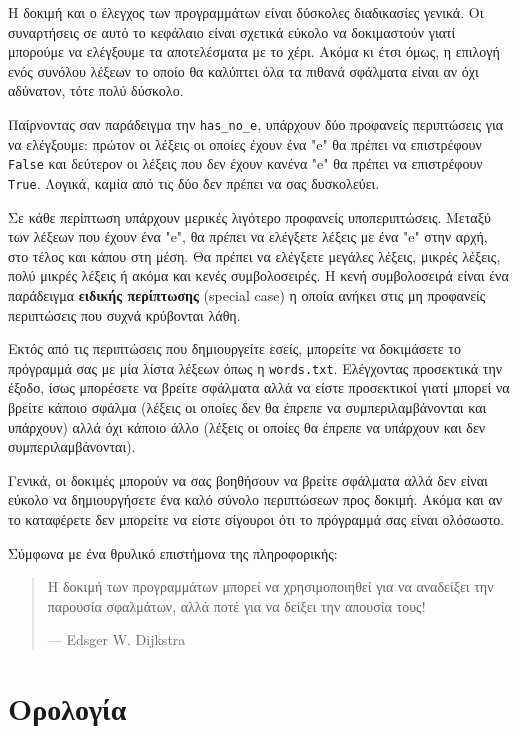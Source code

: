 \documentclass[10pt]{book}
\begin{document}
Η δοκιμή και ο έλεγχος των προγραμμάτων είναι δύσκολες διαδικασίες γενικά.
Οι συναρτήσεις σε αυτό το κεφάλαιο είναι σχετικά εύκολο να δοκιμαστούν γιατί μπορούμε να ελέγξουμε τα αποτελέσματα με το χέρι. Ακόμα κι έτσι όμως, η επιλογή ενός συνόλου λέξεων το οποίο θα καλύπτει όλα τα πιθανά σφάλματα είναι αν όχι αδύνατον, τότε πολύ δύσκολο.

Παίρνοντας σαν παράδειγμα την \verb"has_no_e", υπάρχουν δύο προφανείς περιπτώσεις για να ελέγξουμε: πρώτον οι λέξεις οι οποίες έχουν ένα "e" θα πρέπει να επιστρέφουν {\tt False} και δεύτερον οι λέξεις που δεν έχουν κανένα "e" θα πρέπει να επιστρέφουν {\tt True}. Λογικά, καμία από τις δύο δεν πρέπει να σας δυσκολεύει.

Σε κάθε περίπτωση υπάρχουν μερικές λιγότερο προφανείς υποπεριπτώσεις. Μεταξύ των λέξεων που έχουν ένα "e", θα πρέπει να ελέγξετε λέξεις με ένα "e" στην αρχή, στο τέλος και κάπου στη μέση. Θα πρέπει να ελέγξετε μεγάλες λέξεις, μικρές λέξεις, πολύ μικρές λέξεις ή ακόμα και κενές συμβολοσειρές. Η κενή συμβολοσειρά είναι ένα παράδειγμα {\bf ειδικής περίπτωσης} (special case) η οποία ανήκει στις μη προφανείς περιπτώσεις που συχνά κρύβονται λάθη.

Εκτός από τις περιπτώσεις που δημιουργείτε εσείς, μπορείτε να δοκιμάσετε το πρόγραμμά σας με μία λίστα λέξεων όπως η {\tt words.txt}. Ελέγχοντας προσεκτικά την έξοδο, ίσως μπορέσετε να βρείτε σφάλματα αλλά να είστε προσεκτικοί γιατί μπορεί να βρείτε κάποιο σφάλμα (λέξεις οι οποίες δεν θα έπρεπε να συμπεριλαμβάνονται και υπάρχουν) αλλά όχι κάποιο άλλο (λέξεις οι οποίες θα έπρεπε να υπάρχουν και δεν συμπεριλαμβάνονται).

Γενικά, οι δοκιμές μπορούν να σας βοηθήσουν να βρείτε σφάλματα αλλά δεν είναι εύκολο να δημιουργήσετε ένα καλό σύνολο περιπτώσεων προς δοκιμή. Ακόμα και αν το καταφέρετε δεν μπορείτε να είστε σίγουροι ότι το πρόγραμμά σας είναι ολόσωστο.

Σύμφωνα με ένα θρυλικό επιστήμονα της πληροφορικής:

\begin{quote}

Η δοκιμή των προγραμμάτων μπορεί να χρησιμοποιηθεί για να αναδείξει την παρουσία σφαλμάτων, αλλά ποτέ για να δείξει την απουσία τους!

--- Edsger W. Dijkstra
\end{quote}


\section{Ορολογία}
\end{document}
